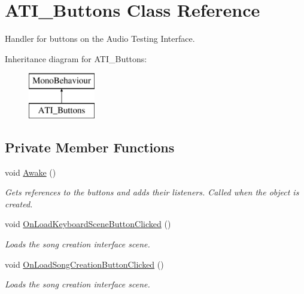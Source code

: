 \hypertarget{class_a_t_i___buttons}{}\section{A\+T\+I\+\_\+\+Buttons Class Reference}
\label{class_a_t_i___buttons}


Handler for buttons on the Audio Testing Interface.  


Inheritance diagram for A\+T\+I\+\_\+\+Buttons\+:\begin{figure}[H]
\begin{center}
\leavevmode
\includegraphics[height=2.000000cm]{class_a_t_i___buttons}
\end{center}
\end{figure}
\subsection*{Private Member Functions}
\begin{DoxyCompactItemize}
\item 
void \hyperlink{group___a_t_i_buttons_unity_gaa24ae34a40539dab6595d1713fc77560}{Awake} ()
\begin{DoxyCompactList}\small\item\em Gets references to the buttons and adds their listeners. Called when the object is created. \end{DoxyCompactList}\item 
void \hyperlink{group___a_t_i_buttons_unity_ga1b9e9b75184e9e26309cc14bda37ad8a}{On\+Load\+Keyboard\+Scene\+Button\+Clicked} ()
\begin{DoxyCompactList}\small\item\em Loads the song creation interface scene. \end{DoxyCompactList}\item 
void \hyperlink{group___a_t_i_buttons_unity_ga6f6e66c53a80c3bcd9b7e7238a3b82fd}{On\+Load\+Song\+Creation\+Button\+Clicked} ()
\begin{DoxyCompactList}\small\item\em Loads the song creation interface scene. \end{DoxyCompactList}\end{DoxyCompactItemize}
